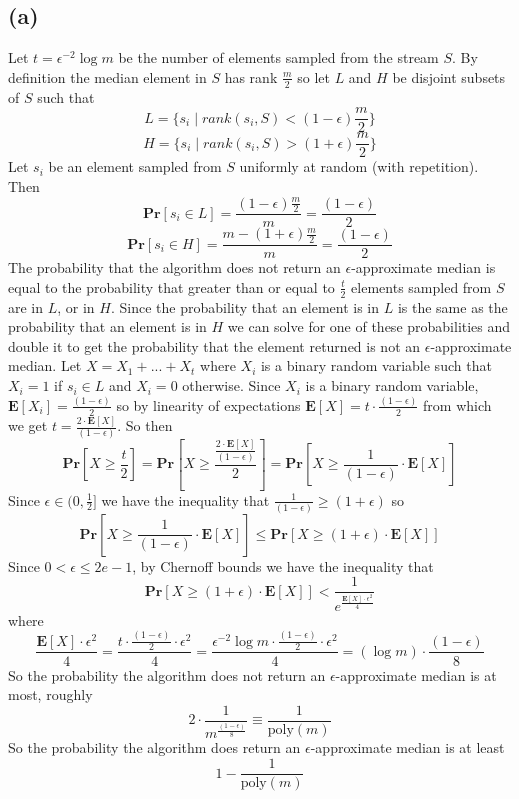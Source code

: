 \documentclass[12pt]{article}
\begin{document}
\subsection*{(a)} Let $t=\epsilon^{-2} \log m$ be the number of elements
sampled from the stream $S$. By definition the median element in $S$ has rank
$\frac{m}{2}$ so let $L$ and $H$ be disjoint subsets of $S$ such that
$$L = \{s_i \mid rank(s_i, S) < (1-\epsilon)\frac{m}{2}\}$$
$$H = \{s_i \mid rank(s_i, S) > (1+\epsilon)\frac{m}{2}\}$$
Let $s_i$ be an element sampled from $S$ uniformly at random 
(with repetition). Then
$$\textbf{Pr}[s_i \in L] = \frac{(1-\epsilon)\frac{m}{2}}{m} =
\frac{(1-\epsilon)}{2}$$
$$\textbf{Pr}[s_i \in H] = \frac{m - (1+\epsilon)\frac{m}{2}}{m} =
\frac{(1-\epsilon)}{2}$$
The probability that the algorithm does not return an $\epsilon$-approximate
median is equal to the probability that greater than or equal to $\frac{t}{2}$
elements sampled from $S$ are in $L$, or in $H$. Since the probability that
an element is in $L$ is the same as the probability that an element is in $H$
we can solve for one of these probabilities and double it to get the
probability that the element returned is not an $\epsilon$-approximate median.
Let $X = X_1 + ... + X_t$ where $X_i$ is a binary random variable such that
$X_i = 1$ if $s_i \in L$ and $X_i = 0$ otherwise. Since $X_i$ is a binary
random variable, $\textbf{E}[X_i] = \frac{(1-\epsilon)}{2}$ so by linearity of
expectations $\textbf{E}[X] = t\cdot \frac{(1-\epsilon)}{2}$ from which we get
$t = \frac{2\cdot \textbf{E}[X]}{(1-\epsilon)}$. So then
$$\textbf{Pr}[X \ge \frac{t}{2}] =
\textbf{Pr}[X \ge \frac{\frac{2\cdot \textbf{E}[X]}{(1-\epsilon)}}{2}] =
\textbf{Pr}[X \ge \frac{1}{(1-\epsilon)}\cdot \textbf{E}[X]]$$
Since $\epsilon \in (0,\frac{1}{2}]$ we have the inequality that
$\frac{1}{(1-\epsilon)} \ge (1+\epsilon)$ so
$$\textbf{Pr}[X \ge \frac{1}{(1-\epsilon)}\cdot \textbf{E}[X]] \le
\textbf{Pr}[X \ge (1+\epsilon) \cdot \textbf{E}[X]]$$
Since $0 < \epsilon \le 2e - 1$, by Chernoff bounds we have the inequality that
$$\textbf{Pr}[X \ge (1+\epsilon) \cdot \textbf{E}[X]] <
\frac{1}{e^{\frac{\textbf{E}[X]\cdot \epsilon^2}{4}}}$$
where
$$\frac{\textbf{E}[X]\cdot \epsilon^2}{4} =
\frac{t\cdot \frac{(1-\epsilon)}{2} \cdot \epsilon^2}{4} =
\frac{\epsilon^{-2} \log m \cdot \frac{(1-\epsilon)}{2} \cdot \epsilon^2}{4} =
(\log m) \cdot \frac{(1-\epsilon)}{8}$$
So the probability the algorithm does not return an $\epsilon$-approximate
median is at most, roughly
$$2\cdot \frac{1}{m^{\frac{(1-\epsilon)}{8}}} \equiv \frac{1}{\text{poly}(m)}$$
So the probability the algorithm does return an $\epsilon$-approximate
median is at least
$$1 - \frac{1}{\text{poly}(m)}$$
\end{document}
